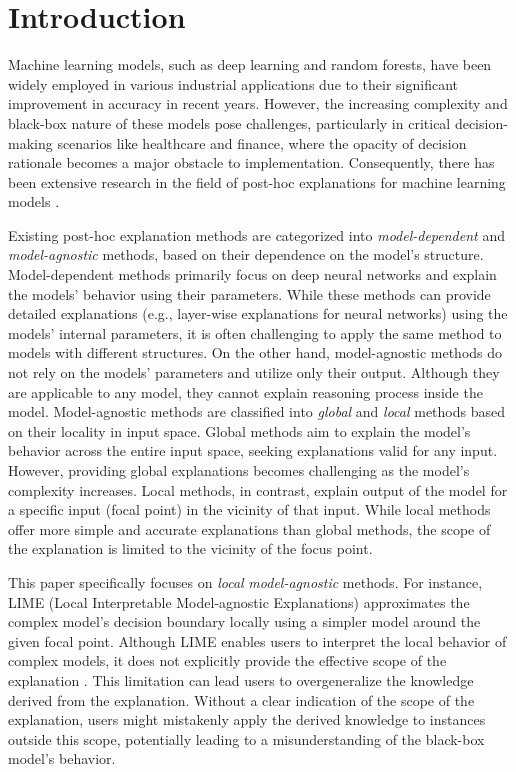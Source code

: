 \documentclass[runningheads]{llncs}
\begin{document}
\section{Introduction}
Machine learning models, such as deep learning and random forests,
have been widely employed in various industrial applications
due to their significant improvement in accuracy in recent years.
However,
the increasing complexity and black-box nature of these models pose challenges,
particularly in critical decision-making scenarios like healthcare and finance,
where the opacity of decision rationale becomes a major obstacle to
implementation.
Consequently,
there has been extensive research in the field of post-hoc explanations
for machine learning models \cite{%
	ribeiro2016why,ribeiro2018anchors,radulovic2023bella,guidotti2018local}.

Existing post-hoc explanation methods are categorized
into \emph{model-dependent} and \emph{model-agnostic} methods,
based on their dependence on the model's structure.
Model-dependent methods primarily focus on deep neural networks and
explain the models' behavior using their parameters.
While these methods can provide detailed explanations
(e.g., layer-wise explanations for neural networks)
using the models' internal parameters,
it is often challenging
to apply the same method to models with different structures.
On the other hand,
model-agnostic methods
do not rely on the models' parameters and utilize only their output.
Although they are applicable to any model,
they cannot explain reasoning process inside the model.
Model-agnostic methods are classified into
\emph{global} and \emph{local} methods based on their locality in input space.
Global methods
aim to explain the model's behavior across the entire input space,
seeking explanations valid for any input.
However, providing global explanations becomes challenging
as the model's complexity increases.
Local methods, in contrast, explain output of the model for a specific input
(focal point) in the vicinity of that input.
While local methods offer more simple and accurate explanations
than global methods,
the scope of the explanation is limited to the vicinity of the focus point.

This paper specifically focuses on \emph{local} \emph{model-agnostic} methods.
For instance, LIME (Local Interpretable Model-agnostic Explanations)
\cite{ribeiro2016why} approximates the complex model's decision boundary
locally using a simpler model around the given focal point.
Although LIME enables users to interpret the local behavior of complex models,
it does not explicitly provide the effective scope of the explanation
\cite{ribeiro2018anchors}.
This limitation can lead
users to overgeneralize the knowledge derived from the explanation.
Without a clear indication of the scope of the explanation,
users might mistakenly apply
the derived knowledge to instances outside this scope,
potentially leading to a misunderstanding of the black-box model's behavior.
\end{document}
